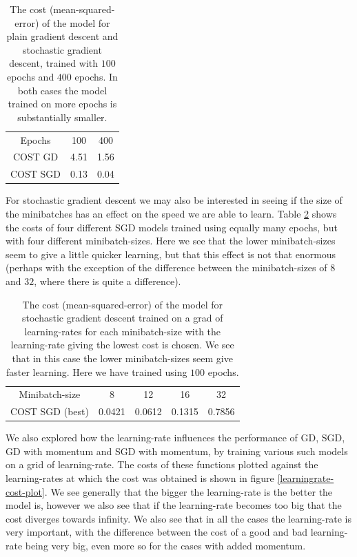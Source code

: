 \documentclass{article}
\begin{document}
\begin{table}
      \centering
      \begin{tabular}{| c | c | c |}
            Epochs   & 100  & 400  \\
            COST GD  & 4.51 & 1.56 \\
            COST SGD & 0.13 & 0.04
      \end{tabular}
      \caption{The cost (mean-squared-error) of the model for plain gradient
            descent and stochastic gradient descent, trained with $100$ epochs and
            $400$ epochs. In both cases the model trained on more epochs is
            substantially smaller.}
      \label{epochs-varying}
\end{table}

For stochastic gradient descent we may also be interested in seeing if the size
of the minibatches has an effect on the speed we are able to learn. Table
\ref{minibatchsize-varying} shows the costs of four different SGD models trained
using equally many epochs, but with four different minibatch-sizes. Here we see
that the lower minibatch-sizes seem to give a little quicker learning, but that
this effect is not that enormous (perhaps with the exception of the difference
between the minibatch-sizes of $8$ and $32$, where there is quite a difference).

\begin{table}
      \centering
      \begin{tabular}{| c | c | c | c | c |}
            Minibatch-size  & 8      & 12     & 16     & 32     \\
            COST SGD (best) & 0.0421 & 0.0612 & 0.1315 & 0.7856
      \end{tabular}
      \caption{The cost (mean-squared-error) of the model for stochastic
            gradient descent trained on a grad of learning-rates for each
            minibatch-size with the learning-rate giving the lowest cost is chosen. We
            see that in this case the lower minibatch-sizes seem give faster
            learning. Here we have trained using $100$ epochs.}
      \label{minibatchsize-varying}
\end{table}

We also explored how the learning-rate influences the performance of GD, SGD, GD
with momentum and SGD with momentum, by training various such models on a grid of
learning-rate.  The costs of these functions plotted against the
learning-rates at which the cost was obtained is shown in figure
\ref{learningrate-cost-plot}. We see generally that the bigger the learning-rate
is the better the model is, however we also see that if the learning-rate becomes
too big that the cost diverges towards infinity. We also see that in all the
cases the learning-rate is very important, with the difference between the cost
of a good and bad learning-rate being very big, even more so for the cases with
added momentum.
\end{document}
